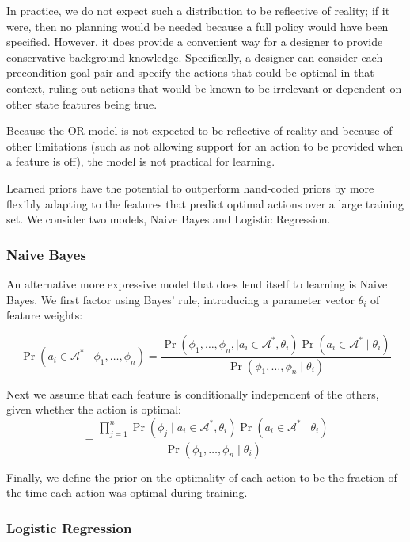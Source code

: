 \documentclass[11pt]{article}
\begin{document}
In practice, we do not expect such a distribution to be reflective of
reality; if it were, then no planning would be needed because a full
policy would have been specified. However, it does provide a
convenient way for a designer to provide conservative background
knowledge. Specifically, a designer can consider each precondition-goal
pair and specify the actions that could be optimal in that context, ruling
out actions that would be known to be irrelevant or dependent on other
state features being true.

Because the OR model is not expected to be reflective of
reality and because of other limitations (such as not allowing support
for an action to be provided when a feature is off), the model is not
practical for learning.

Learned priors have the potential to outperform
hand-coded priors by more flexibly adapting to the
features that predict optimal actions over a large training set.
We consider two models, Naive Bayes and Logistic Regression.

\subsubsection{Naive Bayes}
An alternative more expressive model that does lend itself to learning is
Naive Bayes. We first factor using Bayes' rule, introducing a parameter vector $\theta_i$ of
feature weights:

\begin{equation}
\Pr(a_i \in \mathcal{A}^*  \mid \phi_1, \ldots, \phi_n) = \frac{\Pr(\phi_1, \ldots, \phi_{n}, \mid a_i \in \mathcal{A}^*, \theta_i) \Pr(a_i \in \mathcal{A}^* \mid \theta_i)}{\Pr(\phi_1, \ldots, \phi_{n} \mid \theta_i)}
\label{eq:bayes}
\end{equation}

Next we assume that each feature is conditionally independent of the others, given whether the action is optimal:
\begin{equation}
= \frac{\prod_{j=1}^{n} \Pr(\phi_j \mid a_i \in \mathcal{A}^*, \theta_i) \Pr(a_i \in \mathcal{A}^* \mid \theta_i) }{\Pr(\phi_1, \ldots, \phi_{n} \mid \theta_i)}
\label{eq:final}
\end{equation}

Finally, we define the prior on the optimality of each action to be
the fraction of the time each action was optimal during training.

\subsubsection{Logistic Regression}
\end{document}
